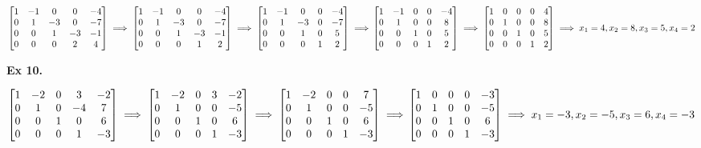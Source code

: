\documentclass{article}
\begin{document}
$
\begin{bmatrix}
1 &-1 &0 &0 &-4\\
0 &1 &-3 &0 &-7\\
0 &0 &1 &-3 &-1\\
0 &0 &0 &2 &4
\end{bmatrix}
\implies
\begin{bmatrix}
1 &-1 &0 &0 &-4\\
0 &1 &-3 &0 &-7\\
0 &0 &1 &-3 &-1\\
0 &0 &0 &1 &2
\end{bmatrix}
\implies
\begin{bmatrix}
1 &-1 &0 &0 &-4\\
0 &1 &-3 &0 &-7\\
0 &0 &1 &0 &5\\
0 &0 &0 &1 &2
\end{bmatrix}
\implies\\
\begin{bmatrix}
1 &-1 &0 &0 &-4\\
0 &1 &0 &0 &8\\
0 &0 &1 &0 &5\\
0 &0 &0 &1 &2
\end{bmatrix}
\implies
\begin{bmatrix}
1 &0 &0 &0 &4\\
0 &1 &0 &0 &8\\
0 &0 &1 &0 &5\\
0 &0 &0 &1 &2
\end{bmatrix}
\implies x_1=4, x_2=8, x_3=5, x_4=2
$

\textbf{Ex 10.}

$
\begin{bmatrix}
1 &-2 &0 &3 &-2\\
0 &1 &0 &-4 &7\\
0 &0 &1 &0 &6\\
0 &0 &0 &1 &-3
\end{bmatrix}
\implies
\begin{bmatrix}
1 &-2 &0 &3 &-2\\
0 &1 &0 &0 &-5\\
0 &0 &1 &0 &6\\
0 &0 &0 &1 &-3
\end{bmatrix}
\implies
\begin{bmatrix}
1 &-2 &0 &0 &7\\
0 &1 &0 &0 &-5\\
0 &0 &1 &0 &6\\
0 &0 &0 &1 &-3
\end{bmatrix}
\implies\\
\begin{bmatrix}
1 &0 &0 &0 &-3\\
0 &1 &0 &0 &-5\\
0 &0 &1 &0 &6\\
0 &0 &0 &1 &-3
\end{bmatrix}
\implies x_1=-3, x_2=-5, x_3=6, x_4=-3
$
\end{document}
